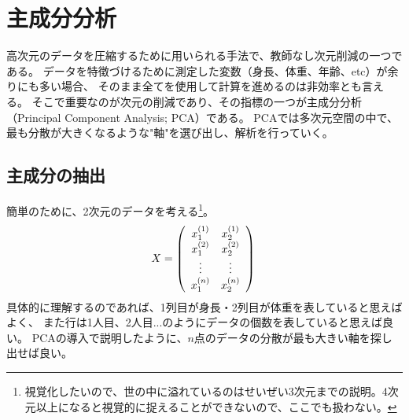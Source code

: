 
\chapter{主成分分析}

高次元のデータを圧縮するために用いられる手法で、教師なし次元削減の一つである。
データを特徴づけるために測定した変数（身長、体重、年齢、etc）が余りにも多い場合、
そのまま全てを使用して計算を進めるのは非効率とも言える。
そこで重要なのが次元の削減であり、その指標の一つが主成分分析（Principal Component Analysis; PCA）である。
PCAでは多次元空間の中で、最も分散が大きくなるような"軸"を選び出し、解析を行っていく。

\section{主成分の抽出}

簡単のために、2次元のデータを考える\footnote{視覚化したいので、世の中に溢れているのはせいぜい3次元までの説明。4次元以上になると視覚的に捉えることができないので、ここでも扱わない。}。
\begin{equation}
  X=
    \left(
  \begin{array}{cc}
    x_1^{(1)} & x_2^{(1)} \\
    x_1^{(2)} & x_2^{(2)} \\
    \vdots    & \vdots    \\
    x_1^{(n)} & x_2^{(n)} \\
  \end{array}
  \right) \\
\end{equation}
具体的に理解するのであれば、1列目が身長・2列目が体重を表していると思えばよく、
また行は1人目、2人目...のようにデータの個数を表していると思えば良い。
PCAの導入で説明したように、$n$点のデータの分散が最も大きい軸を探し出せば良い。


